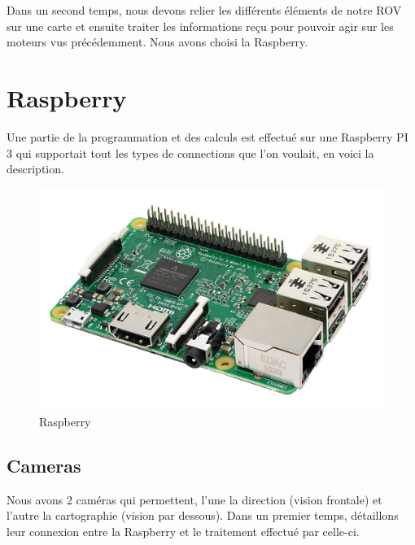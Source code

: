 \documentclass[a4paper,11pt]{report}
\begin{document}
	Dans un second temps, nous devons relier les différents éléments de notre ROV sur une carte et ensuite traiter les informations reçu pour pouvoir agir sur les moteurs vus précédemment. Nous avons choisi la Raspberry.
	
	\section{Raspberry}
		Une partie de la programmation et des calculs est effectué sur une Raspberry PI 3 qui supportait tout les types de connections que l'on voulait, en voici la description.
			\begin{figure}[!h]
					\begin{center}
						\includegraphics[scale=0.2]{Photos/Raspberry.jpg}
						\caption{Raspberry}
					\end{center}
				\end{figure}
				
		\subsection{Cameras}
			Nous avons 2 caméras qui permettent, l'une la direction (vision frontale) et l'autre la cartographie (vision par dessous). Dans un premier temps, détaillons leur connexion entre la Raspberry et le traitement effectué par celle-ci.
			
\end{document}
